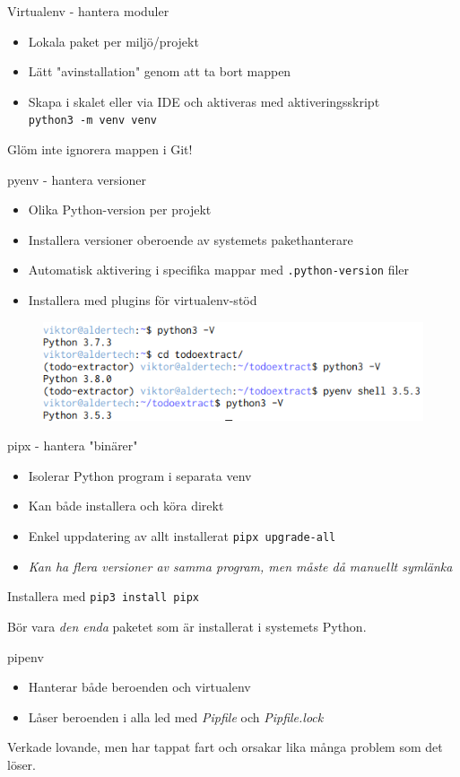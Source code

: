 \begin{frame}{Virtualenv - hantera moduler}
  \begin{itemize}
    \item Lokala paket per miljö/projekt
    \item Lätt "avinstallation" genom att ta bort mappen
    \item Skapa i skalet eller via IDE och aktiveras med aktiveringsskript\\
          \texttt{python3 -m venv venv}\\
  \end{itemize}

  Glöm inte ignorera mappen i Git!
\end{frame}

\begin{frame}{pyenv - hantera versioner}
  \begin{itemize}
    \item Olika Python-version per projekt
    \item Installera versioner oberoende av systemets pakethanterare
    \item Automatisk aktivering i specifika mappar med \texttt{.python-version} filer
    \item Installera med plugins för virtualenv-stöd
  \end{itemize}

  \vfill

  \begin{figure}
    \includegraphics[width=0.8\linewidth,keepaspectratio]{fig/pyenv}
  \end{figure}
\end{frame}

\begin{frame}{pipx - hantera "binärer"}
  \begin{itemize}
    \item Isolerar Python program i separata venv
    \item Kan både installera och köra direkt
    \item Enkel uppdatering av allt installerat \texttt{pipx upgrade-all}
    \item \emph{Kan ha flera versioner av samma program, men måste då manuellt symlänka}
  \end{itemize}

  Installera med \texttt{pip3 install pipx}

  Bör vara \emph{den enda} paketet som är installerat i systemets Python.
\end{frame}

\begin{frame}{pipenv}
  \begin{itemize}
    \item Hanterar både beroenden och virtualenv
    \item Låser beroenden i alla led med \textit{Pipfile} och \textit{Pipfile.lock}
  \end{itemize}

  Verkade lovande, men har tappat fart och orsakar lika många problem som det löser.
\end{frame}
